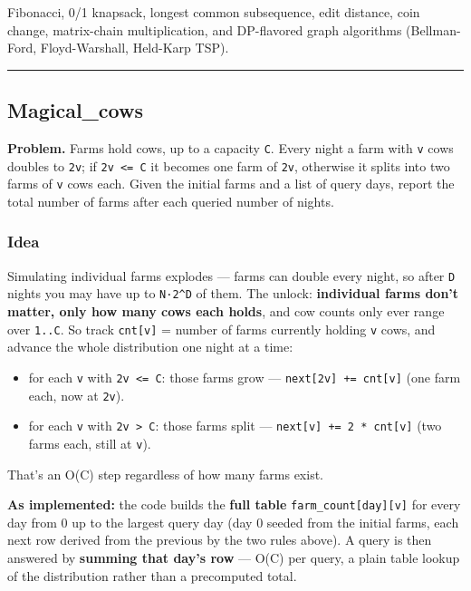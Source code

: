 \documentclass[
  10pt,
  letterpaper,
  onecolumn]{article}
\providecommand{\tightlist}{%
  \setlength{\itemsep}{0pt}\setlength{\parskip}{0pt}}
\begin{document}
Fibonacci, 0/1 knapsack, longest common subsequence, edit distance, coin
change, matrix-chain multiplication, and DP-flavored graph algorithms
(Bellman-Ford, Floyd-Warshall, Held-Karp TSP).

\begin{center}\rule{0.5\linewidth}{0.5pt}\end{center}

\hypertarget{magical_cows}{%
\subsection{Magical\_cows}\label{magical_cows}}

\textbf{Problem.} Farms hold cows, up to a capacity \texttt{C}. Every
night a farm with \texttt{v} cows doubles to \texttt{2v}; if
\texttt{2v\ \textless{}=\ C} it becomes one farm of \texttt{2v},
otherwise it splits into two farms of \texttt{v} cows each. Given the
initial farms and a list of query days, report the total number of farms
after each queried number of nights.

\hypertarget{idea-7}{%
\subsubsection{Idea}\label{idea-7}}

Simulating individual farms explodes --- farms can double every night,
so after \texttt{D} nights you may have up to \texttt{N·2\^{}D} of them.
The unlock: \textbf{individual farms don't matter, only how many cows
each holds}, and cow counts only ever range over \texttt{1..C}. So track
\texttt{cnt{[}v{]}} = number of farms currently holding \texttt{v} cows,
and advance the whole distribution one night at a time:

\begin{itemize}
\tightlist
\item
  for each \texttt{v} with \texttt{2v\ \textless{}=\ C}: those farms
  grow --- \texttt{next{[}2v{]}\ +=\ cnt{[}v{]}} (one farm each, now at
  \texttt{2v}).
\item
  for each \texttt{v} with \texttt{2v\ \textgreater{}\ C}: those farms
  split --- \texttt{next{[}v{]}\ +=\ 2\ *\ cnt{[}v{]}} (two farms each,
  still at \texttt{v}).
\end{itemize}

That's an O(C) step regardless of how many farms exist.

\textbf{As implemented:} the code builds the \textbf{full table}
\texttt{farm\_count{[}day{]}{[}v{]}} for every day from 0 up to the
largest query day (day 0 seeded from the initial farms, each next row
derived from the previous by the two rules above). A query is then
answered by \textbf{summing that day's row} --- O(C) per query, a plain
table lookup of the distribution rather than a precomputed total.
\end{document}

